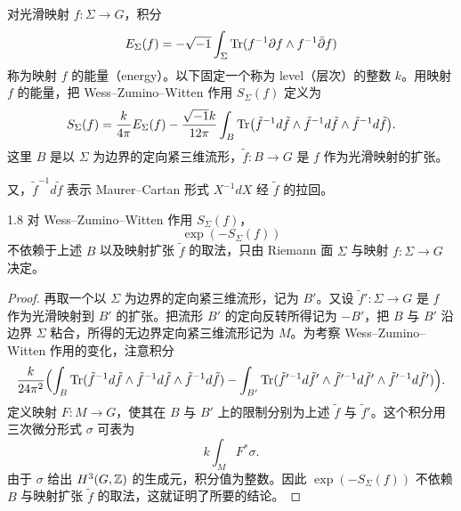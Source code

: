 对光滑映射 $f:\Sigma\to G$，积分
\[
  E_\Sigma(f)=-\sqrt{-1}\int_\Sigma\operatorname{Tr}(f^{-1}\partial f\wedge f^{-1}\bar\partial f)
\]
称为映射 $f$ 的能量（energy）。以下固定一个称为 level（层次）的整数 $k$。用映射 $f$ 的能量，把 Wess--Zumino--Witten 作用 $S_\Sigma(f)$ 定义为
\[
  S_\Sigma(f)=\frac{k}{4\pi}E_\Sigma(f)
  -\frac{\sqrt{-1}k}{12\pi}\int_B\operatorname{Tr}\bigl(\tilde f^{-1}d\tilde f\wedge\tilde f^{-1}d\tilde f\wedge\tilde f^{-1}d\tilde f\bigr).
\]
这里 $B$ 是以 $\Sigma$ 为边界的定向紧三维流形，$\tilde f:B\to G$ 是 $f$ 作为光滑映射的扩张。


又，$\tilde f^{-1}d\tilde f$ 表示 Maurer--Cartan 形式 $X^{-1}dX$ 经 $\tilde f$ 的拉回。

\begin{lemma*}{1.8}
对 Wess--Zumino--Witten 作用 $S_\Sigma(f)$，
\[
  \exp(-S_\Sigma(f))
\]
不依赖于上述 $B$ 以及映射扩张 $\tilde f$ 的取法，只由 Riemann 面 $\Sigma$ 与映射 $f:\Sigma\to G$ 决定。
\end{lemma*}

\begin{proof}
再取一个以 $\Sigma$ 为边界的定向紧三维流形，记为 $B'$。又设 $\tilde f':\Sigma\to G$ 是 $f$ 作为光滑映射到 $B'$ 的扩张。把流形 $B'$ 的定向反转所得记为 $-B'$，把 $B$ 与 $B'$ 沿边界 $\Sigma$ 粘合，所得的无边界定向紧三维流形记为 $M$。为考察 Wess--Zumino--Witten 作用的变化，注意积分
\[
  \frac{k}{24\pi^2}\Bigl(\int_B\operatorname{Tr}(\tilde f^{-1}d\tilde f\wedge\tilde f^{-1}d\tilde f\wedge\tilde f^{-1}d\tilde f)
  -\int_{B'}\operatorname{Tr}(\tilde f'^{-1}d\tilde f'\wedge\tilde f'^{-1}d\tilde f'\wedge\tilde f'^{-1}d\tilde f')\Bigr).
\]
定义映射 $F:M\to G$，使其在 $B$ 与 $B'$ 上的限制分别为上述 $\tilde f$ 与 $\tilde f'$。这个积分用三次微分形式 $\sigma$ 可表为
\[
  k\int_M F^*\sigma .
\]
由于 $\sigma$ 给出 $H^3(G,\mathbb{Z})$ 的生成元，积分值为整数。因此 $\exp(-S_\Sigma(f))$ 不依赖 $B$ 与映射扩张 $\tilde f$ 的取法，这就证明了所要的结论。
\end{proof}


